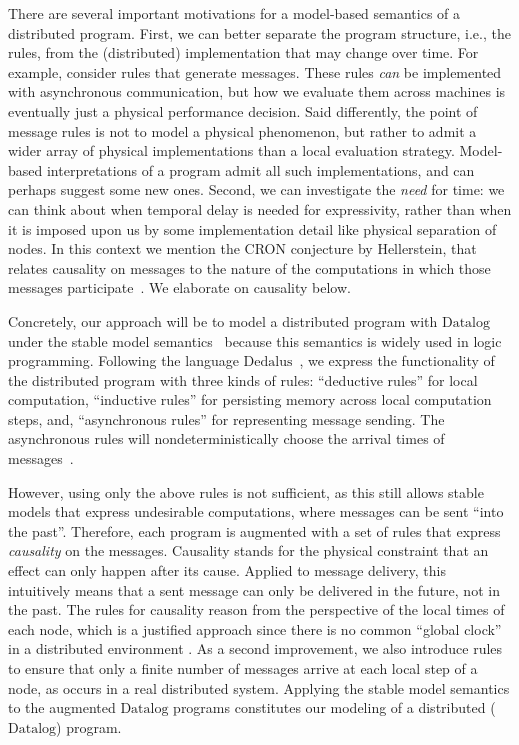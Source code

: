 \documentclass{tlp}
\newcommand{\langname}[1]{\text{#1}}  \newcommand{\pred}[1]{\mathtt{#1}}  \newcommand{\fname}[1]{\mathit{#1}}  \newcommand{\sq}[1]{`{#1}'}
\newcommand{\dedalus}{\langname{Dedalus}}
\newcommand{\datalog}{\langname{Datalog}}
\begin{document}
There are several important motivations for a model-based semantics
of a distributed program. First, we can better separate the program
structure, i.e., the rules, from the (distributed) implementation
that may change over time. For example, consider rules that generate
messages. These rules \emph{can} be implemented with asynchronous
communication, but how we evaluate them across machines is eventually
just a physical performance decision. Said differently, the point
of message rules is not to model a physical phenomenon, but rather
to admit a wider array of physical implementations than a local evaluation
strategy. Model-based interpretations of a program admit all such
implementations, and can perhaps suggest some new ones. Second, we
can investigate the \emph{need} for time: we can think about when
temporal delay is needed for expressivity, rather than when it is
imposed upon us by some implementation detail like physical separation
of nodes. In this context we mention the CRON conjecture by Hellerstein,
that relates causality on messages to the nature of the computations
in which those messages participate~\cite{hellerstein_declimp,ameloot_noncausality2014}.
We elaborate on causality below.

Concretely, our approach will be to model a distributed program with
$\datalog$ under the stable model semantics~\cite{gelfond_stable}
because this semantics is widely used in logic programming. Following
the language $\dedalus$~\cite{dedalus,dedalus-datalog20,hellerstein_declimp},
we express the functionality of the distributed program with three
kinds of rules: ``deductive rules'' for local computation, ``inductive
rules'' for persisting memory across local computation steps, and,
``asynchronous rules'' for representing message sending. The asynchronous
rules will nondeterministically choose the arrival times of messages~\cite{datalog_choice,sz_nondet}.

However, using only the above rules is not sufficient, as this still
allows stable models that express undesirable computations, where
messages can be sent ``into the past''. Therefore, each program
is augmented with a set of rules that express \emph{causality} on
the messages. Causality stands for the physical constraint that an
effect can only happen after its cause. Applied to message delivery,
this intuitively means that a sent message can only be delivered in
the future, not in the past. The rules for causality reason from the
perspective of the local times of each node, which is a justified
approach since there is no common ``global clock'' in a distributed
environment \cite{attiyawelch_dcbook}. As a second improvement, we
also introduce rules to ensure that only a finite number of messages
arrive at each local step of a node, as occurs in a real distributed
system. Applying the stable model semantics to the augmented $\datalog$
programs constitutes our modeling of a distributed ($\datalog$)
program.
\end{document}
